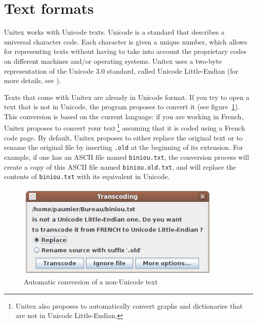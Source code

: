 \section{Text formats}
\label{section-conversion-texte-unicode}
Unitex works with Unicode texts. Unicode is a standard that describes a universal
character code. Each character is given a unique number, which allows for
representing texts without having to take into account  the proprietary codes on
different machines and/or operating systems. Unitex uses a two-byte
representation of the Unicode 3.0 standard, called Unicode Little-Endian (for
more details, see \cite{UNICODE}).

\bigskip
{}
\noindent Texts that come with Unitex are already in Unicode format. If you try
to open a text that is not in Unicode, the program proposes to convert it
(see figure~\ref{auto-transcoding}).
This conversion is based on the current language: if you are working in French,
Unitex proposes to convert your text\,\footnote{Unitex also proposes to
automatically convert graphs and dictionaries that are not in Unicode
Little-Endian.} assuming that it is coded using a French code page. By default,
Unitex proposes to either replace the original text or to rename the original
file by inserting \verb$.old$ at the beginning of  its extension. For example, if
one has an ASCII file named \verb$biniou.txt$, the conversion process will create
a copy of this ASCII file named \verb$biniou.old.txt$, and will replace the
contents of \verb$biniou.txt$ with its equivalent in Unicode.


\begin{figure}[!h]
\begin{center}
\includegraphics[width=10cm]{resources/img/fig2-2.png}
\caption{\label{auto-transcoding}Automatic conversion of a non-Unicode text}
\end{center}
\end{figure}

